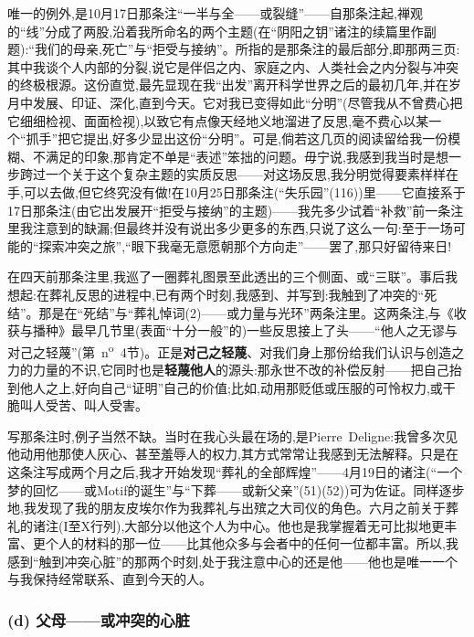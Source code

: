 \dmark{}唯一的例外,是10月17日那条注“一半与全——或裂缝”——自那条注起,禅观的“线”分成了两股,沿着我所命名的两个主题(在“阴阳之钥”诸注的续篇里作副题):“我们的母亲,死亡”与“拒受与接纳”。所指的是那条注的最后部分,即那两三页:其中我谈个人内部的分裂,说它是伴侣之内、家庭之内、人类社会之内分裂与冲突的终极根源。这份直觉,最先显现在我“出发”离开科学世界之后的最初几年,并在岁月中发展、印证、深化,直到今天。它对我已变得如此“分明”(尽管我从不曾费心把它细细检视、面面检视),以致它有点像天经地义地溜进了反思,毫不费心以某一个“抓手”把它提出,好多少显出这份“分明”。可是,倘若这几页的阅读留给我一份模糊、不满足的印象,那肯定不单是“表述”笨拙的问题。毋宁说,我感到我当时是想一步跨过一个关于这个复杂主题的实质反思——对这场反思,我分明觉得要素样样在手,可以去做,但它终究没有做!在10月25日那条注(“失乐园”(116))里——它直接系于17日那条注(由它出发展开“拒受与接纳”的主题)——我先多少试着“补救”前一条注里我注意到的缺漏;但最终并没有说出多少更多的东西,只说了这么一句:至于一场可能的“探索冲突之旅”,“眼下我毫无意愿朝那个方向走”——罢了,那只好留待来日!

\asterisms

\dmark{}在四天前那条注里,我巡了一圈葬礼图景至此透出的三个侧面、或“三联”。事后我想起:在葬礼反思的进程中,已有两个时刻,我感到、并写到:我触到了冲突的“死结”。那是在“死结”与“葬礼悼词(2)——或力量与光环”两条注里。这两条注,与《收获与播种》最早几节里(表面“十分一般”的)一些反思接上了头——“他人之无谬与对己之轻蔑”(第~n\textsuperscript{o}~4节)。正是\textbf{对己之轻蔑}、对我们身上那份给我们认识与创造之力的力量的不识,它同时也是\textbf{轻蔑他人}的源头:那永世不改的补偿反射——把自己抬到他人之上,好向自己“证明”自己的价值;比如,动用那贬低或压服的可怜权力,或干脆叫人受苦、叫人受害。

写那条注时,例子当然不缺。当时在我心头最在场的,是Pierre~Deligne:我曾多次见他动用他那使人灰心、甚至羞辱人的权力,其方式常常让我感到无法解释。只是在这条注写成两个月之后,我才开始发现“葬礼的全部辉煌”——4月19日的诸注(“一个梦的回忆——或Motif的诞生”与“下葬——或新父亲”(51)(52))可为佐证。同样逐步地,我发现了我的朋友皮埃尔作为我葬礼与出殡之大司仪的角色。六月之前关于葬礼的诸注(I至X行列),大部分以他这个人为中心。他也是我掌握着无可比拟地更丰富、更个人的材料的那一位——比其他众多与会者中的任何一位都丰富。所以,我感到“触到冲突心脏”的那两个时刻,处于我注意中心的还是他——他也是唯一一个与我保持经常联系、直到今天的人。

\subsubsection*{(d) 父母——或冲突的心脏}
\label{ch18:local:h38}

